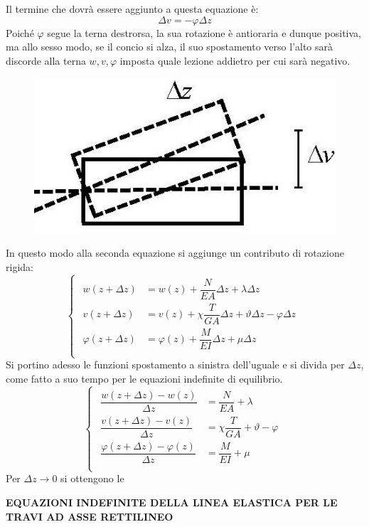\documentclass{article}
\begin{document}
\begin{adjustwidth}{2in}{}
			Il termine che dovrà essere aggiunto a questa equazione è:
				\[ \Delta v = -\varphi\Delta z \]
			Poiché $\varphi$ segue la terna destrorsa, la sua rotazione è antioraria e dunque positiva, ma allo sesso modo, se il concio si alza, il suo spostamento verso l'alto sarà discorde alla terna $w, v, \varphi$ imposta quale lezione addietro per cui sarà negativo. 			
\begin{figure}[H]
	\centering
	\includegraphics[width=0.3\linewidth]{"immagini/1.PARTE8_Pagina_11"}
\end{figure}
			In questo modo alla seconda equazione si aggiunge un contributo di rotazione rigida:
			\[
				\begin{cases}
						\begin{aligned}
							w(z+\Delta z) & = w(z) + \dfrac{N}{EA}\Delta z + \lambda\Delta z \\
							v(z+\Delta z) & = v(z) + \chi\dfrac{T}{GA}\Delta z +\vartheta\Delta z- \varphi\Delta z \\
							\varphi(z+\Delta z) & = \varphi(z) + \dfrac{M}{EI}\Delta z + \mu\Delta z \\
						\end{aligned}	
				\end{cases}
			\]	
		Si portino adesso le funzioni spostamento a sinistra dell'uguale e si divida per $\Delta z$, come fatto a suo tempo per le equazioni indefinite di equilibrio.  
		\[
		\begin{cases}
			\begin{aligned}
				\dfrac{w(z+\Delta z)- w(z)}{\Delta z} & = \dfrac{N}{EA} + \lambda \\
				\dfrac{v(z+\Delta z) -v(z)}{\Delta z} & = \chi\dfrac{T}{GA} +\vartheta - \varphi \\
				\dfrac{\varphi(z+\Delta z) -\varphi(z)}{\Delta z} & = \dfrac{M}{EI} + \mu \\
			\end{aligned}	
		\end{cases}
		\]
		Per $ \Delta z \rightarrow 0 $	si ottengono le \newline
		
		\begin{center}
			\textbf{EQUAZIONI INDEFINITE DELLA LINEA ELASTICA PER LE TRAVI AD ASSE RETTILINEO}	 \newline 
		\end{center}
	

\end{adjustwidth}
\end{document}
